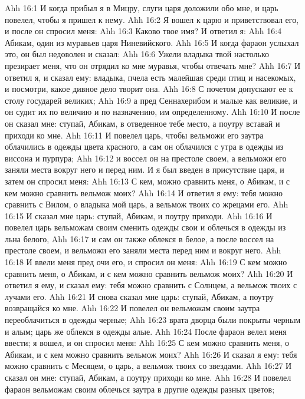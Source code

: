 \vs Ahh 16:1
И когда прибыл я в Мицру, слуги царя доложили обо мне, и царь повелел, чтобы я пришел к нему.
\vs Ahh 16:2
Я вошел к царю и приветствовал его, и после он спросил меня:
\vs Ahh 16:3
Каково твое имя? И ответил я:
\vs Ahh 16:4
Абикам, один из муравьев царя Ниневийского.
\vs Ahh 16:5
И когда фараон услыхал это, он был недоволен и сказал:
\vs Ahh 16:6
Ужели владыка твой настолько презирает меня, что он отрядил ко мне муравья, чтобы отвечать мне?
\vs Ahh 16:7
И ответил я, и сказал ему: владыка, пчела есть малейшая среди птиц и насекомых, и посмотри, какое дивное дело творит она.
\vs Ahh 16:8
С почетом допускают ее к столу государей великих;
\vs Ahh 16:9
а пред Сеннахерибом и малые как великие, и он судит их по величию и по назначению, им определенному.
\vs Ahh 16:10
И после он сказал мне: ступай, Абикам, в отведенное тебе место, а поутру вставай и приходи ко мне.
\vs Ahh 16:11
И повелел царь, чтобы вельможи его заутра облачились в одежды цвета красного, а сам он облачился с утра в одежды из виссона и пурпура;
\vs Ahh 16:12
и воссел он на престоле своем, а вельможи его заняли места вокруг него и перед ним. И я был введен в присутствие царя, и затем он спросил меня:
\vs Ahh 16:13
С кем, можно сравнить меня, о Абикам, и с кем можно сравнить вельмож моих?
\vs Ahh 16:14
И ответил я ему: тебя можно сравнить с Вилом, о владыка мой царь, а вельмож твоих со жрецами его.
\vs Ahh 16:15
И сказал мне царь: ступай, Абикам, и поутру приходи.
\vs Ahh 16:16
И повелел царь вельможам своим сменить одежды свои и облечься в одежды из льна белого,
\vs Ahh 16:17
и сам он также облекся в белое, а после воссел на престоле своем, и вельможи его заняли места перед ним и вокруг него.
\vs Ahh 16:18
И ввели меня пред очи его, и спросил он меня:
\vs Ahh 16:19
С кем можно сравнить меня, о Абикам, и с кем можно сравнить вельмож моих?
\vs Ahh 16:20
И ответил я ему, и сказал ему: тебя можно сравнить с Солнцем, а вельмож твоих с лучами его.
\vs Ahh 16:21
И снова сказал мне царь: ступай, Абикам, а поутру возвращайся ко мне.
\vs Ahh 16:22
И повелел он вельможам своим заутра переоблачиться в одежды черные;
\vs Ahh 16:23
врата дворца были покрыты черным и алым; царь же облекся в одежды алые.
\vs Ahh 16:24
После фараон велел меня ввести; я вошел, и он спросил меня:
\vs Ahh 16:25
С кем можно сравнить меня, о Абикам, и с кем можно сравнить вельмож моих?
\vs Ahh 16:26
И сказал я ему: тебя можно сравнить с Месяцем, о царь, а вельмож твоих со звездами.
\vs Ahh 16:27
И сказал он мне: ступай, Абикам, а поутру приходи ко мне.
\vs Ahh 16:28
И повелел фараон вельможам своим облечься заутра в другие одежды разных цветов;
